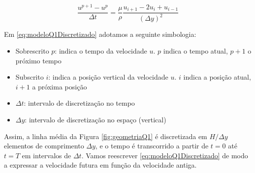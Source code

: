\begin{equation}\label{eq:modeloQ1Discretizado}
    \frac{u^{p+1} - u^p}{\Delta t} = \frac{\mu}{\rho} \frac{u_{i+1} - 2u_i + u_{i-1}}{\left(\Delta y\right)^2}
\end{equation}

Em \eqref{eq:modeloQ1Discretizado} adotamos a seguinte simbologia:

\begin{itemize}
    \item Sobrescrito $p$: indica o tempo da velocidade $u$. $p$ indica o tempo atual, $p + 1$ o próximo tempo
    \item Subscrito $i$: indica a posição vertical da velocidade $u$. $i$ indica a posição atual, $i + 1$ a próxima posição
    \item $\Delta t$: intervalo de discretização no tempo
    \item $\Delta y$: intervalo de discretização no espaço (vertical)
\end{itemize}

Assim, a linha média da Figura \ref*{fig:geometriaQ1} é discretizada em $H / \Delta y$ elementos de
comprimento $ \Delta y$, e o tempo é transcorrido a partir de $t = 0$ até $t = T$ em intervalos de  
$ \Delta t$. Vamos reescrever \eqref{eq:modeloQ1Discretizado} de modo a expressar a 
velocidade futura em função da velocidade antiga. 








